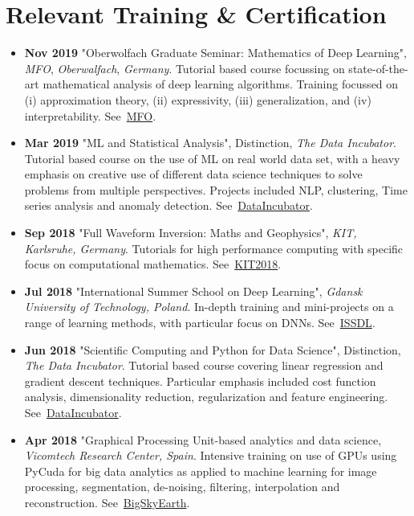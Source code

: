 \section{Relevant Training \& Certification}
\begin{itemize}
    \item \textbf{Nov 2019} "Oberwolfach Graduate Seminar: Mathematics of Deep Learning", \textit{MFO}, \textit{Oberwalfach}, \textit{Germany}. Tutorial based course focussing on state-of-the-art mathematical analysis of deep learning algorithms. Training focussed on (i) approximation theory, (ii) expressivity, (iii) generalization, and (iv) interpretability. See~\href{https://www.mfo.de/occasion/1947a}{\url{MFO}}.
    
    \item \textbf{Mar 2019} "ML and Statistical Analysis", Distinction, \textit{The Data Incubator}. Tutorial based course on the use of ML on real world data set, with a heavy emphasis on creative use of different data science techniques to solve problems from multiple perspectives. Projects included NLP, clustering, Time series analysis and anomaly detection. See~\href{https://wqu.org/programs/data-science}{\url{DataIncubator}}.
    
    \item \textbf{Sep 2018} "Full Waveform Inversion: Maths and Geophysics", \textit{KIT, Karlsruhe, Germany}. Tutorials for high performance computing with specific focus on computational mathematics. See~\href{https://www.waves.kit.edu/summerschool2018.php}{\url{KIT2018}}.
    
    \item \textbf{Jul 2018} "International Summer School on Deep Learning", \textit{Gdansk University of Technology, Poland}. In-depth training and mini-projects on a range of learning methods, with particular focus on DNNs. See~\href{http://2018.dl-lab.eu/}{\url{ISSDL}}.
    
    \item \textbf{Jun 2018} "Scientific Computing and Python for Data Science", Distinction, \textit{The Data Incubator}. Tutorial based course covering linear regression and gradient descent techniques. Particular emphasis included cost function analysis, dimensionality reduction, regularization and feature engineering. See~\href{https://wqu.org/programs/data-science}{\url{DataIncubator}}.
    
    \item \textbf{Apr 2018} "Graphical Processing Unit-based analytics and data science, \textit{Vicomtech Research Center, Spain}. Intensive training on use of GPUs using PyCuda for big data analytics as applied to machine learning for image processing, segmentation, de-noising, filtering, interpolation and reconstruction. See~\href{https://bigskyearth.eu/apply-to-the-bigskyearth-training-school-2018-gpu-based-analytics-and-data-science/}{\url{BigSkyEarth}}.
    
\end{itemize}
